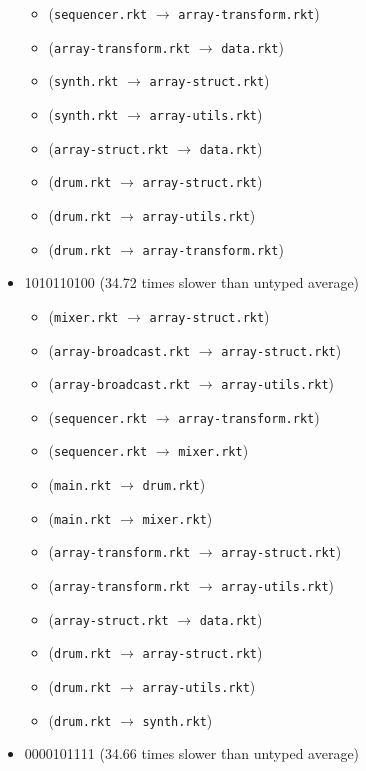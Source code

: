\documentclass{article}
\newcommand{\mono}[1]{\texttt{#1}}
\begin{document}
\begin{itemize}
\begin{itemize}
  \item (\mono{sequencer.rkt} $\rightarrow$ \mono{array-transform.rkt})
  \item (\mono{array-transform.rkt} $\rightarrow$ \mono{data.rkt})
  \item (\mono{synth.rkt} $\rightarrow$ \mono{array-struct.rkt})
  \item (\mono{synth.rkt} $\rightarrow$ \mono{array-utils.rkt})
  \item (\mono{array-struct.rkt} $\rightarrow$ \mono{data.rkt})
  \item (\mono{drum.rkt} $\rightarrow$ \mono{array-struct.rkt})
  \item (\mono{drum.rkt} $\rightarrow$ \mono{array-utils.rkt})
  \item (\mono{drum.rkt} $\rightarrow$ \mono{array-transform.rkt})
  \end{itemize}
\item 1010110100 (34.72 times slower than untyped average)
  \begin{itemize}
  \item (\mono{mixer.rkt} $\rightarrow$ \mono{array-struct.rkt})
  \item (\mono{array-broadcast.rkt} $\rightarrow$ \mono{array-struct.rkt})
  \item (\mono{array-broadcast.rkt} $\rightarrow$ \mono{array-utils.rkt})
  \item (\mono{sequencer.rkt} $\rightarrow$ \mono{array-transform.rkt})
  \item (\mono{sequencer.rkt} $\rightarrow$ \mono{mixer.rkt})
  \item (\mono{main.rkt} $\rightarrow$ \mono{drum.rkt})
  \item (\mono{main.rkt} $\rightarrow$ \mono{mixer.rkt})
  \item (\mono{array-transform.rkt} $\rightarrow$ \mono{array-struct.rkt})
  \item (\mono{array-transform.rkt} $\rightarrow$ \mono{array-utils.rkt})
  \item (\mono{array-struct.rkt} $\rightarrow$ \mono{data.rkt})
  \item (\mono{drum.rkt} $\rightarrow$ \mono{array-struct.rkt})
  \item (\mono{drum.rkt} $\rightarrow$ \mono{array-utils.rkt})
  \item (\mono{drum.rkt} $\rightarrow$ \mono{synth.rkt})
  \end{itemize}
\item 0000101111 (34.66 times slower than untyped average)
  \begin{itemize}

\end{itemize}
\end{itemize}
\end{document}
